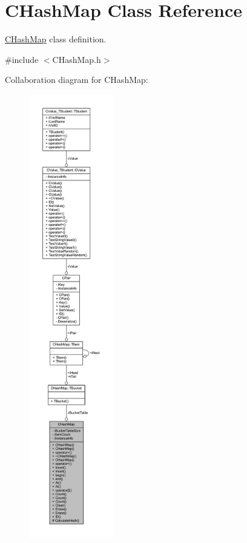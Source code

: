 \hypertarget{class_c_hash_map}{}\section{C\+Hash\+Map Class Reference}
\label{class_c_hash_map}


\hyperlink{class_c_hash_map}{C\+Hash\+Map} class definition.  




{\ttfamily \#include $<$C\+Hash\+Map.\+h$>$}



Collaboration diagram for C\+Hash\+Map\+:
\nopagebreak
\begin{figure}[H]
\begin{center}
\leavevmode
\includegraphics[height=550pt]{class_c_hash_map__coll__graph}
\end{center}
\end{figure}
